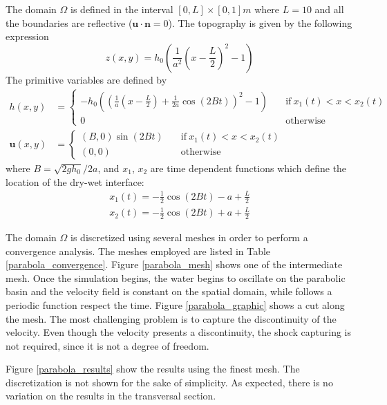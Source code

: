 \documentclass[a4paper,12pt]{article}
\begin{document}
The domain $\Omega$ is defined in the interval $[0,L]\times[0,1]m$ where $L=10$ and all the boundaries are reflective ($\mathbf{u}\cdot\mathbf{n} = 0$). The topography is given by the following expression
\begin{equation}
z(x,y) = h_0 \left(\frac{1}{a^2}\left(x - \frac{L}{2}\right)^2 - 1\right)
\end{equation}
The primitive variables are defined by
\begin{subequations}
\begin{align}
h(x,y) &=
\begin{cases}
-h_0\left(\left(\frac{1}{a}\left(x - \frac{L}{2}\right) + \frac{1}{2a}\cos(2Bt)\right)^2 - 1\right)
\quad &\text{if} \ x_1(t) < x < x_2(t) \\
0 \quad &\text{otherwise}
\end{cases} \\
\mathbf{u}(x,y) &=
\begin{cases}
(B,0)\sin(2Bt) \quad &\text{if} \ x_1(t) < x < x_2(t) \\
(0,0) \quad &\text{otherwise}
\end{cases}
\end{align}
\end{subequations}
where $B=\sqrt{2gh_0}/2a$, and $x_1$, $x_2$ are time dependent functions which define the location of the dry-wet interface:
\begin{equation}
\begin{split}
x_1(t) = -\frac{1}{2}\cos(2Bt) - a + \frac{L}{2} \\
x_2(t) = -\frac{1}{2}\cos(2Bt) + a + \frac{L}{2}
\end{split}
\end{equation}

The domain $\Omega$ is discretized using several meshes in order to perform a convergence analysis. The meshes employed are listed in Table \ref{parabola_convergence}. Figure \ref{parabola_mesh} shows one of the intermediate mesh. Once the simulation begins, the water begins to oscillate on the parabolic basin and the velocity field is constant on the spatial domain, while follows a periodic function respect the time. Figure \ref{parabola_graphic} shows a cut along the mesh. The most challenging problem is to capture the discontinuity of the velocity. Even though the velocity presents a discontinuity, the shock capturing is not required, since it is not a degree of freedom.

Figure \ref{parabola_results} show the results using the finest mesh. The discretization is not shown for the sake of simplicity. As expected, there is no variation on the results in the transversal section.
\end{document}
